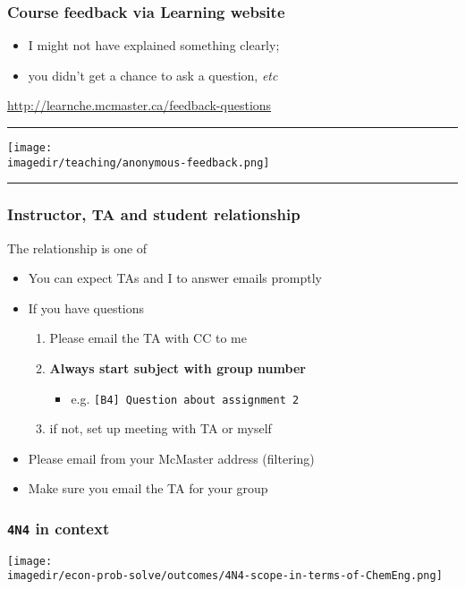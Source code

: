 \begin{frame}\frametitle{Course feedback via Learning website}
	\begin{itemize}
		\item	I might not have explained something clearly;
		\item	you didn't get a chance to ask a question, \emph{etc}
	\end{itemize}
	\href{http://learnche.mcmaster.ca/feedback-questions}{http://learnche.mcmaster.ca/feedback-questions}
	\vspace{12pt}
	\hrule
	\begin{center}
		\texttt{[image: \\imagedir/teaching/anonymous-feedback.png]}
	\end{center}
	\hrule
\end{frame}

\begin{frame}\frametitle{Instructor, TA and student relationship}
	\begin{exampleblock}{}
		The relationship is one of {}
	\end{exampleblock}

	\begin{itemize}
		\item	You can expect TAs and I to answer emails promptly

		\vspace{12pt}
		\item	If you have questions
			\begin{enumerate}
				\item	Please email the TA with CC to me \hfill {\tiny{\color{myOrange}{$\longleftarrow$ hopefully this solves your problem}}}
				\item	\textbf{Always start subject with group number}
				\begin{itemize}
					\item	e.g. \texttt{[B4] Question about assignment 2}
				\end{itemize}
				\item	if not, set up meeting with TA or myself
			\end{enumerate}
		\item	Please email from your McMaster address (filtering)
		\item	Make sure you email the TA for your group
	\end{itemize}
\end{frame}

\begin{frame}\frametitle{\texttt{4N4} in context}
	\begin{center}
		\texttt{[image: \\imagedir/econ-prob-solve/outcomes/4N4-scope-in-terms-of-ChemEng.png]}
	\end{center}
\end{frame}

